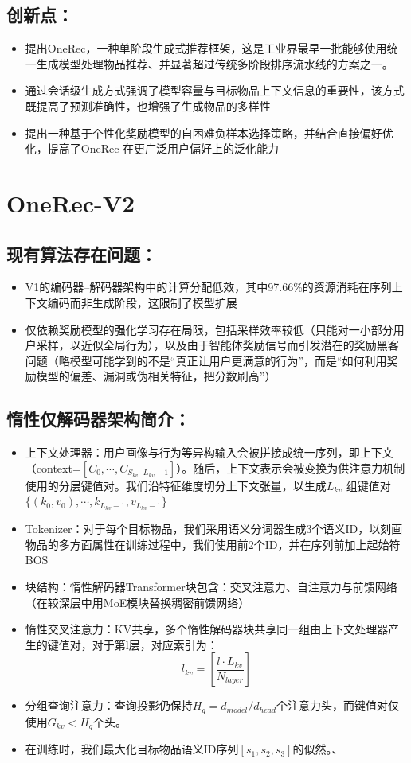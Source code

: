 \documentclass[UTF8]{ctexart}
\begin{document}
\subsection{创新点：}
\begin{itemize}
    \item 提出OneRec，一种单阶段生成式推荐框架，这是工业界最早一批能够使用统一生成模型处理物品推荐、并显著超过传统多阶段排序流水线的方案之一。
    \item 通过会话级生成方式强调了模型容量与目标物品上下文信息的重要性，该方式既提高了预测准确性，也增强了生成物品的多样性
    \item 提出一种基于个性化奖励模型的自困难负样本选择策略，并结合直接偏好优化，提高了OneRec 在更广泛用户偏好上的泛化能力
\end{itemize}


\section{OneRec-V2}
\subsection{现有算法存在问题：}  
\begin{itemize}
    \item V1的编码器–解码器架构中的计算分配低效，其中97.66\%的资源消耗在序列上下文编码而非生成阶段，这限制了模型扩展
    \item 仅依赖奖励模型的强化学习存在局限，包括采样效率较低（只能对一小部分用户采样，以近似全局行为），以及由于智能体奖励信号而引发潜在的奖励黑客问题（略模型可能学到的不是“真正让用户更满意的行为”，而是“如何利用奖励模型的偏差、漏洞或伪相关特征，把分数刷高”）
\end{itemize}

\subsection{惰性仅解码器架构简介：}
\begin{itemize}
    \item 上下文处理器：用户画像与行为等异构输入会被拼接成统一序列，即上下文（context=$[C_0,\cdots,C_{S_{kv}\cdot L_{kv}-1}]$）。随后，上下文表示会被变换为供注意力机制使用的分层键值对。我们沿特征维度切分上下文张量，以生成$L_{kv}$ 组键值对$\{(k_0,v_0),\cdots ,{k_{L_{kv}-1},v_{L_{kv}-1}}\}$
    \item Tokenizer：对于每个目标物品，我们采用语义分词器生成3个语义ID，以刻画物品的多方面属性在训练过程中，我们使用前2个ID，并在序列前加上起始符BOS
    \item 块结构：惰性解码器Transformer块包含：交叉注意力、自注意力与前馈网络（在较深层中用MoE模块替换稠密前馈网络）
    \item 惰性交叉注意力：KV共享，多个惰性解码器块共享同一组由上下文处理器产生的键值对，对于第l层，对应索引为：
    $$ l_{kv}=[\frac{l\cdot L_{kv}}{N_{layer}}] $$
    \item 分组查询注意力：查询投影仍保持$H_q=d_{model}/d_{head}$个注意力头，而键值对仅使用$G_{kv}<H_q$个头。
    \item 在训练时，我们最大化目标物品语义ID序列$[s_1,s_2,s_3]$的似然。、
\end{itemize}
\end{document}
